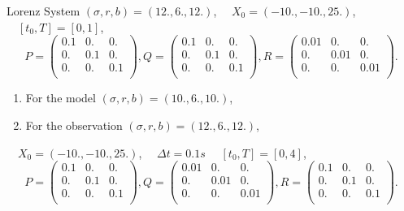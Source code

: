\begin{frame}[allowframebreaks]{Lorenz System}
    $(\sigma, r, b)=(12.,6.,12.)$, $\quad X_0=(-10.,-10.,25.)$, $\quad [t_0,T]=[0,1]$,
	$$P=\begin{pmatrix}
    0.1 & 0. & 0. \\
    0. & 0.1 & 0. \\
    0. & 0. & 0.1 \\
    \end{pmatrix} ,
    Q=\begin{pmatrix}
    0.1 & 0. & 0. \\
    0. & 0.1 & 0. \\
    0. & 0. & 0.1 \\
    \end{pmatrix},
    R=\begin{pmatrix}
    0.01 & 0. & 0. \\
    0. & 0.01 & 0. \\
    0. & 0. & 0.01 \\
    \end{pmatrix}.$$ 
	
	\newpage
	
    \begin{enumerate}[\textbullet]
		\item For the model $(\sigma, r, b)=(10.,6.,10.)$,
		\item For the observation $(\sigma, r, b)=(12.,6.,12.)$,
	\end{enumerate}
	$\quad X_0=(-10.,-10.,25.)$, $\quad \Delta t=0.1s$ $\quad [t_0,T]=[0,4]$,
	$$P=\begin{pmatrix}
    0.1 & 0. & 0. \\
    0. & 0.1 & 0. \\
    0. & 0. & 0.1 \\
    \end{pmatrix} ,
    Q=\begin{pmatrix}
    0.01 & 0. & 0. \\
    0. & 0.01 & 0. \\
    0. & 0. & 0.01 \\
    \end{pmatrix},
    R=\begin{pmatrix}
    0.1 & 0. & 0. \\
    0. & 0.1 & 0. \\
    0. & 0. & 0.1 \\
    \end{pmatrix}.$$

	\begin{figure}
		\centering
	\end{figure}


\end{frame}
